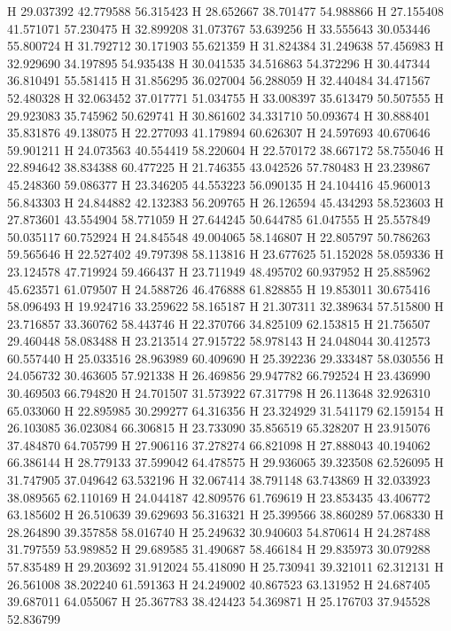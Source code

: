 \documentclass{article}
\begin{document}
H 29.037392 42.779588 56.315423
H 28.652667 38.701477 54.988866
H 27.155408 41.571071 57.230475
H 32.899208 31.073767 53.639256
H 33.555643 30.053446 55.800724
H 31.792712 30.171903 55.621359
H 31.824384 31.249638 57.456983
H 32.929690 34.197895 54.935438
H 30.041535 34.516863 54.372296
H 30.447344 36.810491 55.581415
H 31.856295 36.027004 56.288059
H 32.440484 34.471567 52.480328
H 32.063452 37.017771 51.034755
H 33.008397 35.613479 50.507555
H 29.923083 35.745962 50.629741
H 30.861602 34.331710 50.093674
H 30.888401 35.831876 49.138075
H 22.277093 41.179894 60.626307
H 24.597693 40.670646 59.901211
H 24.073563 40.554419 58.220604
H 22.570172 38.667172 58.755046
H 22.894642 38.834388 60.477225
H 21.746355 43.042526 57.780483
H 23.239867 45.248360 59.086377
H 23.346205 44.553223 56.090135
H 24.104416 45.960013 56.843303
H 24.844882 42.132383 56.209765
H 26.126594 45.434293 58.523603
H 27.873601 43.554904 58.771059
H 27.644245 50.644785 61.047555
H 25.557849 50.035117 60.752924
H 24.845548 49.004065 58.146807
H 22.805797 50.786263 59.565646
H 22.527402 49.797398 58.113816
H 23.677625 51.152028 58.059336
H 23.124578 47.719924 59.466437
H 23.711949 48.495702 60.937952
H 25.885962 45.623571 61.079507
H 24.588726 46.476888 61.828855
H 19.853011 30.675416 58.096493
H 19.924716 33.259622 58.165187
H 21.307311 32.389634 57.515800
H 23.716857 33.360762 58.443746
H 22.370766 34.825109 62.153815
H 21.756507 29.460448 58.083488
H 23.213514 27.915722 58.978143
H 24.048044 30.412573 60.557440
H 25.033516 28.963989 60.409690
H 25.392236 29.333487 58.030556
H 24.056732 30.463605 57.921338
H 26.469856 29.947782 66.792524
H 23.436990 30.469503 66.794820
H 24.701507 31.573922 67.317798
H 26.113648 32.926310 65.033060
H 22.895985 30.299277 64.316356
H 23.324929 31.541179 62.159154
H 26.103085 36.023084 66.306815
H 23.733090 35.856519 65.328207
H 23.915076 37.484870 64.705799
H 27.906116 37.278274 66.821098
H 27.888043 40.194062 66.386144
H 28.779133 37.599042 64.478575
H 29.936065 39.323508 62.526095
H 31.747905 37.049642 63.532196
H 32.067414 38.791148 63.743869
H 32.033923 38.089565 62.110169
H 24.044187 42.809576 61.769619
H 23.853435 43.406772 63.185602
H 26.510639 39.629693 56.316321
H 25.399566 38.860289 57.068330
H 28.264890 39.357858 58.016740
H 25.249632 30.940603 54.870614
H 24.287488 31.797559 53.989852
H 29.689585 31.490687 58.466184
H 29.835973 30.079288 57.835489
H 29.203692 31.912024 55.418090
H 25.730941 39.321011 62.312131
H 26.561008 38.202240 61.591363
H 24.249002 40.867523 63.131952
H 24.687405 39.687011 64.055067
H 25.367783 38.424423 54.369871
H 25.176703 37.945528 52.836799
\end{document}
